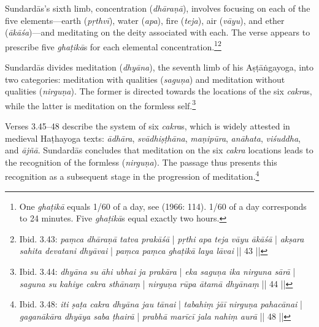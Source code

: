 Sundardās's sixth limb, concentration (\textit{dhāraṇā}), involves focusing on each of the five elements---earth (\textit{pṛthvī}), water (\textit{apa}), fire (\textit{teja}), air (\textit{vāyu}), and ether (\textit{ākāśa})---and meditating on the deity associated with each. The verse appears to prescribe five \textit{ghaṭikā}s for each elemental concentration.\footnote{One \textit{ghaṭikā} equals 1/60 of a day, see \citeauthor{sircar1966} (1966: 114). 1/60 of a day corresponds to 24 minutes. Five \textit{ghaṭikā}s equal exactly two hours.}\footnote{Ibid. 3.43: \textit{paṃca dhāraṇā tatva prakāśā} | \textit{pṛthi apa teja vāyu ākāśā} | \textit{akṣara sahita devatani dhyāvai} | \textit{paṃca paṃca ghaṭikā laya lāvai} || 43 ||}

Sundardās divides meditation (\textit{dhyāna}), the seventh limb of his Aṣṭāṅgayoga, into two categories: meditation with qualities (\textit{saguṇa}) and meditation without qualities (\textit{nirguṇa}). The former is directed towards the locations of the six \textit{cakra}s, while the latter is meditation on the formless self.\footnote{Ibid. 3.44: \textit{dhyāna su āhi ubhai ja prakāra} | \textit{eka saguṇa ika nirguna sārā} | \textit{saguna su kahiye cakra sthānaṃ} | \textit{nirguṇa rūpa ātamā dhyānaṃ} || 44 ||}

Verses 3.45–48 describe the system of six \textit{cakra}s, which is widely attested in medieval Haṭhayoga texts: \textit{ādhāra}, \textit{svādhiṣṭhāna}, \textit{maṇipūra}, \textit{anāhata}, \textit{viśuddha}, and \textit{ājñā}. Sundardās concludes that meditation on the six \textit{cakra} locations leads to the recognition of the formless (\textit{nirguṇa}). The passage thus presents this recognition as a subsequent stage in the progression of meditation.\footnote{Ibid. 3.48: \textit{iti ṣaṭa cakra dhyāna jau tānai} | \textit{tabahiṃ jāī nirguṇa pahacānai} | \textit{gaganākāra dhyāya saba ṭhairā} | \textit{prabhā marīcī jala nahiṃ aurā} || 48 ||}

